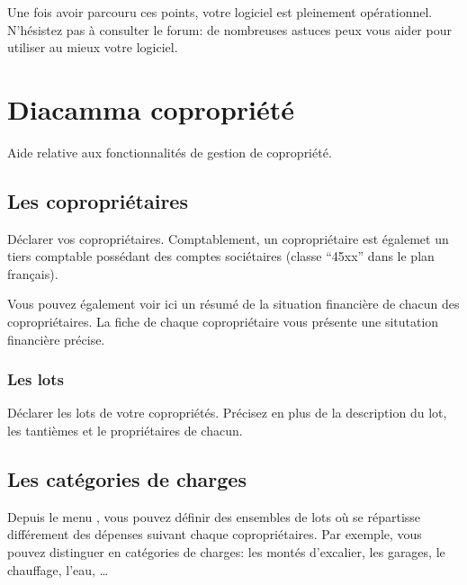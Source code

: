 \documentclass[a4paper,10pt,oneside,french]{sphinxmanual}
\begin{document}
Une fois avoir parcouru ces points, votre logiciel  est pleinement opérationnel.
N’hésistez pas à consulter le forum: de nombreuses astuces peux vous aider pour utiliser au mieux votre logiciel.


\chapter{Diacamma copropriété}
\label{\detokenize{condominium/index:diacamma-copropriete}}\label{\detokenize{condominium/index::doc}}
Aide relative aux fonctionnalités de gestion de copropriété.


\section{Les copropriétaires}
\label{\detokenize{condominium/owners:les-coproprietaires}}\label{\detokenize{condominium/owners::doc}}
Déclarer vos copropriétaires.
Comptablement, un copropriétaire est égalemet un tiers comptable possédant des comptes sociétaires (classe “45xx” dans le plan français).

Vous pouvez également voir ici un résumé de la situation financière de chacun des copropriétaires.
La fiche de chaque copropriétaire vous présente une situtation financière précise.


\subsection{Les lots}
\label{\detokenize{condominium/owners:les-lots}}
Déclarer les lots de votre copropriétés.
Précisez en plus de la description du lot, les tantièmes et le propriétaires de chacun.
\begin{quote}

\noindent{}
\end{quote}


\section{Les catégories de charges}
\label{\detokenize{condominium/classloads:les-categories-de-charges}}\label{\detokenize{condominium/classloads::doc}}
Depuis le menu , vous pouvez définir des ensembles de lots où se répartisse différement des dépenses suivant chaque copropriétaires.
Par exemple, vous pouvez distinguer en catégories de charges: les montés d’excalier, les garages, le chauffage, l’eau, …
\end{document}
